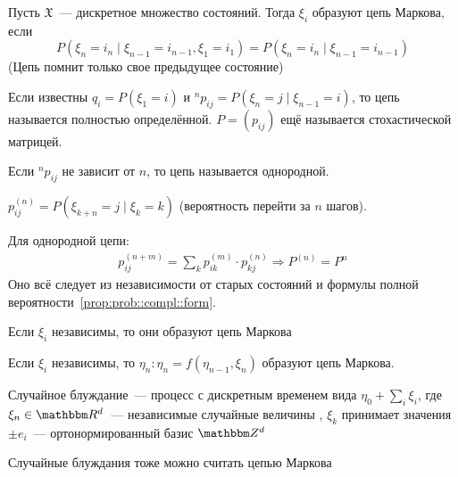 \documentclass[12pt, timbord]{../../../notes}
\begin{document}
\begin{defn}\label{defn:proc::markchain::chain}
  Пусть $\mathfrak X$~--- дискретное множество состояний. Тогда $\xi_i$ образуют цепь Маркова, если 
  \[
    P(\xi_n = i_n \mid \xi_{n-1} = i_{n-1}, \xi_1 = i_1) = P(\xi_n = i_n \mid \xi_{n-1} = i_{n-1})
  \]
  (Цепь помнит только свое предыдущее состояние)
\end{defn}

\begin{defn}\label{defn:proc::markchain::def}
  Если известны $q_i = P(\xi_1=i)$ и $^np_{ij} =  P(\xi_n = j \mid \xi_{n-1} = i) $, то
  цепь называется полностью определённой. $P = (p_{ij})$ ещё называется стохастической матрицей. 
\end{defn}

\begin{defn}\label{defn:proc::markchain::homo}
  Если $^n p_{ij}$ не зависит от $n$, то цепь называется однородной. 
\end{defn}

\begin{defn}\label{defn:proc::markchain::trannstep}
  $p^{(n)}_{ij} = P(\xi_{k+n} = j \mid \xi_{k} =k) $ (вероятность перейти за $n$ шагов). 
\end{defn}

\begin{prop}\label{prop:proc::markchain::trmul}
  Для однородной цепи:
  \begin{align*}
    p^{(n+m)}_{ij} = \sum_k p_{ik}^{(m)} \cdot p_{kj}^{(n)} \Rightarrow 
    P^{(n)} = P^n
  \end{align*}
  Оно всё следует из независимости от старых состояний и формулы полной 
  вероятности~\ref{prop:prob::compl::form}.
\end{prop}

\begin{exmp}\label{exmp:proc::markchain::ind}
  Если $\xi_i$ независимы, то они образуют цепь Маркова  
\end{exmp}
\begin{exmp}\label{exmp:proc::markchain::func}
  Если $\xi_i$ независимы, то $\eta_n \colon \eta_n = f(\eta_{n-1}, \xi_n)$ образуют цепь Маркова.
\end{exmp}

\begin{defn}\label{exmp:proc::markchain::randomwalk}
  Случайное блуждание~--- процесс с дискретным временем вида $\eta_0 + \sum_i \xi_i$, где
   $\xi_n \in \R^d$~--- независимые случайные величины , $\xi_k$ принимает значения $\pm e_i$~---
   ортонормированный базис $\Z^d$
\end{defn}
Случайные блуждания тоже можно считать цепью Маркова
\end{document}
